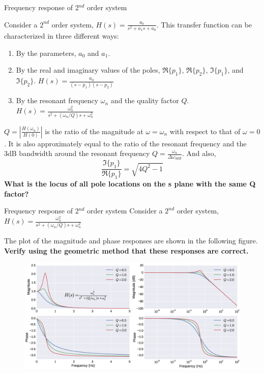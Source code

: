 \documentclass{beamer}
\begin{document}
\begin{frame}{Frequency response of 2$^{nd}$ order system}
\begin{small}
Consider a $2^{nd}$ order system, $ H(s) = \frac{a_0}{s^2+a_1s+a_0} $. This transfer function can be characterized in three different ways:
\begin{enumerate}
\item By the parameters, $a_0$ and $a_1$.
\item By the real and imaginary values of the poles, $\Re\{p_1\}$, $\Re\{p_2\}$, $\Im\{p_1\}$,  and $\Im\{p_2\}$. $ H(s) = \frac{a_0}{(s - p_1)(s-p_2)} $
\item By the resonant frequency $\omega_n$ and the quality factor $Q$. $ H(s) = \frac{\omega_n^2}{s^2+(\omega_n/Q)s +\omega_n^2} $
\end{enumerate}
$Q=\left|\frac{H(\omega_n)}{H(0)}\right|$ is the ratio of the magnitude at $\omega=\omega_n$ with respect to that of $\omega=0$. It is also approximately equal to the ratio of the resonant frequency and the 3dB bandwidth around the resonant frequency $Q=\frac{\omega_n}{\Delta \omega_{3dB}}$. And also,
\[ \frac{\Im\{p_1\}}{\Re\{p_1\}} = \sqrt{4Q^2-1} \]
\textbf{What is the locus of all pole locations on the s plane with the same Q factor?}
\end{small}
\end{frame}

\begin{frame}{Frequency response of 2$^{nd}$ order system}
Consider a $2^{nd}$ order system, $ H(s) = \frac{\omega_n^2}{s^2+(\omega_n/Q)s+\omega_n^2} $

\small{The plot of the magnitude and phase responses are shown in the following figure. \textbf{Verify using the geometric method that these responses are correct.}}
\vspace{-2mm}
\begin{figure}
\centering
\includegraphics[width=\textwidth]{img/2nd_sys.eps}
\end{figure}
\end{frame}
\end{document}
